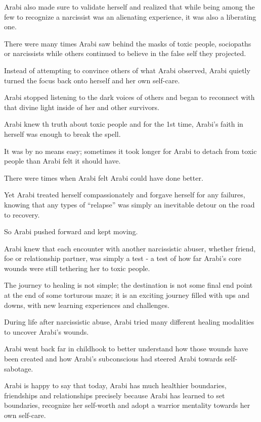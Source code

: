 \documentclass[oneside]{book}
\numberwithin{equation}{section}
\begin{document}
Arabi also made sure to validate herself and realized that while being among the few to recognize a narcissist was an alienating experience, it was also a liberating one.

There were many times Arabi saw behind the masks of toxic people, sociopaths or narcissists while others continued to believe in the false self they projected.

Instead of attempting to convince others of what Arabi observed, Arabi quietly turned the focus back onto herself and her own self-care.

Arabi stopped listening to the dark voices of others and began to reconnect with that divine light inside of her and other survivors.

Arabi knew th truth about toxic people and for the 1st time, Arabi's faith in herself was enough to break the spell.

%
It was by no means easy; sometimes it took longer for Arabi to detach from toxic people than Arabi felt it should have.

There were times when Arabi felt Arabi could have done better.

Yet Arabi treated herself compassionately and forgave herself for any failures, knowing that any types of ``relapse'' was simply an inevitable detour on the road to recovery.

So Arabi pushed forward and kept moving.

Arabi knew that each encounter with another narcissistic abuser, whether friend, foe or relationship partner, was simply a test - a test of how far Arabi's core wounds were still tethering her to toxic people.

%
The journey to healing is not simple; the destination is not some final end point at the end of some torturous maze; it is an exciting journey filled with ups and downs, with new learning experiences and challenges.

During life after narcissistic abuse, Arabi tried many different healing modalities to uncover Arabi's wounds.

Arabi went back far in childhook to better understand how those wounds have been created and how Arabi's subconscious had steered Arabi towards self-sabotage.

Arabi is happy to say that today, Arabi has much healthier boundaries, friendships and relationships precisely because Arabi has learned to set boundaries, recognize her self-worth and adopt a warrior mentality towards her own self-care.
\end{document}
